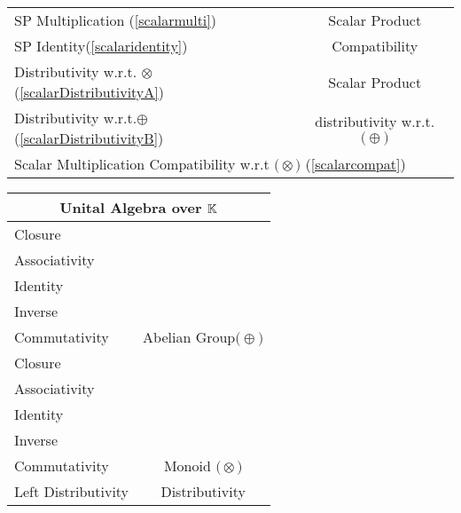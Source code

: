 \documentclass[a4paper,12pt]{scrartcl}    %
\newcommand{\OpA}{\otimes}
\newcommand{\OpB}{\oplus}
\begin{document}
\begin{landscape}
\begin{minipage}[t][]{0.60 \linewidth}
\begin{minipage}[c]{0,5\textwidth}
\begin{tabular}{|l|c|}
			   \hline
			  \hline
			     \cellcolor{blue!25} \footnotesize SP Multiplication (\ref{scalarmulti})&  \tiny\cellcolor{yellow!25}Scalar Product\\
			    \cellcolor{blue!25} \footnotesize SP Identity(\ref{scalaridentity}) & \tiny\cellcolor{yellow!25} Compatibility  \\
			   \hline 
			    \cellcolor{blue!25} \footnotesize Distributivity w.r.t. $\OpA$ (\ref{scalarDistributivityA})&  \tiny\cellcolor{yellow!25}Scalar Product\\
			    \cellcolor{blue!25} \footnotesize Distributivity w.r.t.$\OpB$ (\ref{scalarDistributivityB}) & \tiny\cellcolor{yellow!25} distributivity w.r.t. $\big(\OpB\big)$  \\
			   \hline
			    \multicolumn{2}{l}{\footnotesize \cellcolor{blue!25} Scalar Multiplication Compatibility w.r.t  $\big(\OpA\big)$ (\ref{scalarcompat})}\\
			   \hline
			\end{tabular}
			\vfill
			\begin{tabular}{|l|c|} %
			  \hline
			  \multicolumn{2}{c}{\cellcolor{green!25}Unital Algebra over $\mathbb{K}$} \\
			  \hline
			    \cellcolor{blue!25} \footnotesize Closure& \cellcolor{yellow!25}  \\
			    \cellcolor{blue!25} \footnotesize Associativity& \cellcolor{yellow!25}  \\
			    \cellcolor{blue!25} \footnotesize Identity& \cellcolor{yellow!25} \\
			    \cellcolor{blue!25} \footnotesize Inverse& \cellcolor{yellow!25} \\
			    \cellcolor{blue!25} \footnotesize Commutativity& \multirow{-5}{*}{\tiny\cellcolor{yellow!25}Abelian Group$\big(\OpB\big)$} \\
			   \hline
			    \cellcolor{blue!25} \footnotesize Closure& \cellcolor{yellow!25}  \\
			    \cellcolor{blue!25} \footnotesize Associativity& \cellcolor{yellow!25}  \\
			    \cellcolor{blue!25} \footnotesize Identity& \cellcolor{yellow!25} \\
			    \cellcolor{red!25} \footnotesize Inverse& \cellcolor{yellow!25} \\
			    \cellcolor{red!25} \footnotesize Commutativity& \multirow{-5}{*}{\tiny\cellcolor{yellow!25} Monoid $\big(\OpA\big)$} \\
			  \hline
			  	\cellcolor{blue!25} \footnotesize Left Distributivity&  \tiny\cellcolor{yellow!25}Distributivity\\

\end{tabular}
\end{minipage}
\end{minipage}
\end{landscape}
\end{document}
